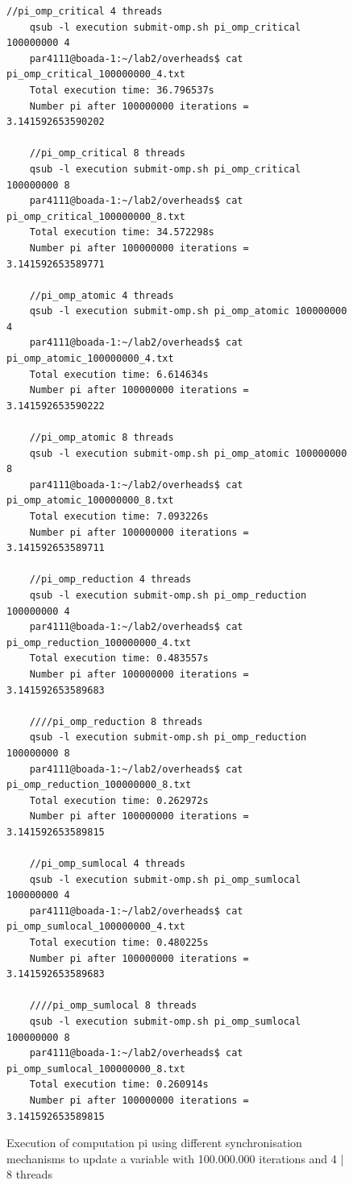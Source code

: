 \documentclass[12]{article}
\begin{document}
\begin{figure}[H]
\begin{lstlisting}[frame=single]
    //pi_omp_critical 4 threads
    qsub -l execution submit-omp.sh pi_omp_critical 100000000 4
    par4111@boada-1:~/lab2/overheads$ cat pi_omp_critical_100000000_4.txt 
    Total execution time: 36.796537s
    Number pi after 100000000 iterations = 3.141592653590202

    //pi_omp_critical 8 threads
    qsub -l execution submit-omp.sh pi_omp_critical 100000000 8
    par4111@boada-1:~/lab2/overheads$ cat pi_omp_critical_100000000_8.txt 
    Total execution time: 34.572298s
    Number pi after 100000000 iterations = 3.141592653589771

    //pi_omp_atomic 4 threads
    qsub -l execution submit-omp.sh pi_omp_atomic 100000000 4
    par4111@boada-1:~/lab2/overheads$ cat pi_omp_atomic_100000000_4.txt 
    Total execution time: 6.614634s
    Number pi after 100000000 iterations = 3.141592653590222

    //pi_omp_atomic 8 threads
    qsub -l execution submit-omp.sh pi_omp_atomic 100000000 8
    par4111@boada-1:~/lab2/overheads$ cat pi_omp_atomic_100000000_8.txt 
    Total execution time: 7.093226s
    Number pi after 100000000 iterations = 3.141592653589711

    //pi_omp_reduction 4 threads
    qsub -l execution submit-omp.sh pi_omp_reduction 100000000 4
    par4111@boada-1:~/lab2/overheads$ cat pi_omp_reduction_100000000_4.txt 
    Total execution time: 0.483557s
    Number pi after 100000000 iterations = 3.141592653589683

    ////pi_omp_reduction 8 threads
    qsub -l execution submit-omp.sh pi_omp_reduction 100000000 8
    par4111@boada-1:~/lab2/overheads$ cat pi_omp_reduction_100000000_8.txt 
    Total execution time: 0.262972s
    Number pi after 100000000 iterations = 3.141592653589815

    //pi_omp_sumlocal 4 threads
    qsub -l execution submit-omp.sh pi_omp_sumlocal 100000000 4
    par4111@boada-1:~/lab2/overheads$ cat pi_omp_sumlocal_100000000_4.txt 
    Total execution time: 0.480225s
    Number pi after 100000000 iterations = 3.141592653589683

    ////pi_omp_sumlocal 8 threads
    qsub -l execution submit-omp.sh pi_omp_sumlocal 100000000 8
    par4111@boada-1:~/lab2/overheads$ cat pi_omp_sumlocal_100000000_8.txt 
    Total execution time: 0.260914s
    Number pi after 100000000 iterations = 3.141592653589815
\end{lstlisting}
\caption{Execution of computation pi using different synchronisation mechanisms to update a variable with 100.000.000 iterations and 4 | 8  threads}
\label{overheadsComputation}
\end{figure}
\end{document}
